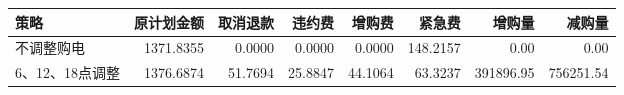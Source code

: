 \begin{tabular}{lrrrrrrr}
\toprule
策略 & 原计划金额 & 取消退款 & 违约费 & 增购费 & 紧急费 & 增购量 & 减购量 \\
\midrule
不调整购电 & 1371.8355 & 0.0000 & 0.0000 & 0.0000 & 148.2157 & 0.00 & 0.00 \\
6、12、18点调整 & 1376.6874 & 51.7694 & 25.8847 & 44.1064 & 63.3237 & 391896.95 & 756251.54 \\
\bottomrule
\end{tabular}
